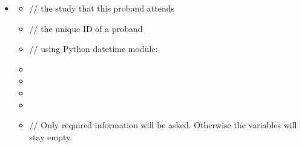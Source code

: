 \documentclass[a4paper]{scrreprt}
\begin{document}
{\begin{itemize}
                    \item {}
                        \begin{itemize}
                            \item {}
                                \par // the study that this proband attends
                            \item {}
                                \par // the unique ID of a proband
                            \item {}
                                \par // using Python datetime module: 
                            \item {}
                            \item {}
                            \item {}
                            \item {}
                            \item {}
                                \par // Only required information will be asked. Otherwise the variables will stay empty.
                        \end{itemize}


\end{itemize}}
\end{document}
